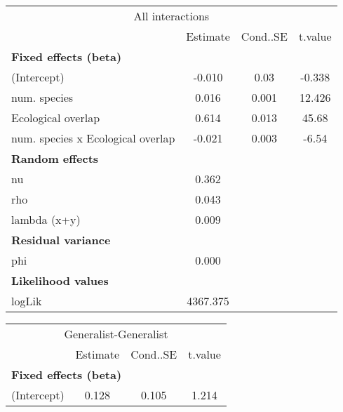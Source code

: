 \begin{table}
\centering\begin{table}
\centering\centering
\begin{tabular}[t]{l|c|c|c}
\hline
\multicolumn{4}{c}{All interactions} \\
\cline{1-4}
  & Estimate & Cond..SE & t.value\\
\hline
\multicolumn{4}{l}{\textbf{Fixed effects (beta)}}\\
\hline
\hspace{1em}(Intercept) & -0.010 & 0.03 & -0.338\\
\hline
\hspace{1em}num. species & 0.016 & 0.001 & 12.426\\
\hline
\hspace{1em}Ecological overlap & 0.614 & 0.013 & 45.68\\
\hline
\hspace{1em}num. species x Ecological overlap & -0.021 & 0.003 & -6.54\\
\hline
\multicolumn{4}{l}{\textbf{Random effects}}\\
\hline
\hspace{1em}nu & 0.362 &  & \\
\hline
\hspace{1em}rho & 0.043 &  & \\
\hline
\hspace{1em}lambda (x+y) & 0.009 &  & \\
\hline
\multicolumn{4}{l}{\textbf{Residual variance}}\\
\hline
\hspace{1em}phi & 0.000 &  & \\
\hline
\multicolumn{4}{l}{\textbf{Likelihood values}}\\
\hline
\hspace{1em}logLik & 4367.375 &  & \\
\hline
\end{tabular}
\end{table}\begin{table}
\centering\centering
\begin{tabular}[t]{l|c|c|c}
\hline
\multicolumn{4}{c}{Generalist-Generalist} \\
\cline{1-4}
  & Estimate & Cond..SE & t.value\\
\hline
\multicolumn{4}{l}{\textbf{Fixed effects (beta)}}\\
\hline
\hspace{1em}(Intercept) & 0.128 & 0.105 & 1.214\\

\end{tabular}
\end{table}
\end{table}
